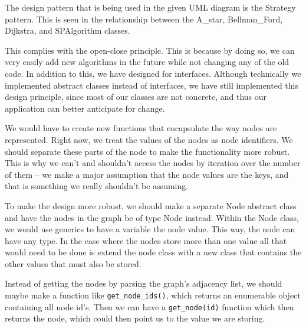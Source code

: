 \documentclass{article}
\begin{document}
The design pattern that is being used in the given UML diagram is the Strategy pattern. This is seen in the relationship between the A\_star, Bellman\_Ford, Dijkstra, and SPAlgorithm classes. 

This complies with the open-close principle. This is because by doing so, 
we can very easily add new algorithms in the future while not changing any of the old code. In addition to this, we have designed for interfaces. Although technically 
we implemented abstract classes instead of interfaces, we have still implemented this design principle, since most of our classes are not concrete, and thus
our application can better anticipate for change. 

We would have to create new functions that encapsulate the way nodes are represented. Right now, we treat the values of the nodes as node identifiers. We should separate these parts of the node to make the functionality more robust. This is why we can't and shouldn't access the nodes by iteration over the number of them -- we make a major assumption that the node values are the keys, and that is something we really shouldn't be assuming.

To make the design more robust, we should make a separate Node abstract class
and have the nodes in the graph be of type Node instead. Within the Node class, we would use generics to have a variable the node value. This way, the node can have any type. In the case where the nodes store more than one value all that would need to be done is extend the node class with a new class that contains the other values that must also be stored. 

Instead of getting the nodes by parsing the graph's adjacency list, we should maybe make a function like \verb|get_node_ids()|, which returns an enumerable object containing all node id's. Then we can have a \verb|get_node(id)| function which then returns the node, which could then point us to the value we are storing.
\end{document}
